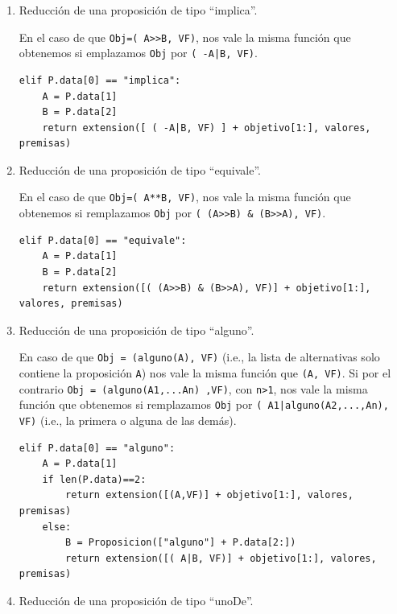 \documentclass[10pt,a4paper]{report}
\begin{document}
\begin{enumerate}
\begin{verbatim}
\end{verbatim}
\item Reducción de una proposición de tipo ``implica''.
\label{sec:orgf054ee0}

En el caso de que \texttt{Obj=( A>{}>{}B, VF)}, nos vale la misma función que obtenemos si emplazamos \texttt{Obj} por \texttt{( -A|B, VF)}.
\begin{verbatim}
elif P.data[0] == "implica":
    A = P.data[1]
    B = P.data[2]
    return extension([ ( -A|B, VF) ] + objetivo[1:], valores, premisas)
\end{verbatim}
\item Reducción de una proposición de tipo ``equivale''.
\label{sec:org54e8a53}

En el caso de que \texttt{Obj=( A**B, VF)}, nos vale la misma función que obtenemos si remplazamos \texttt{Obj} por \texttt{( (A>{}>{}B) \& (B>{}>{}A), VF)}.
\begin{verbatim}
elif P.data[0] == "equivale":
    A = P.data[1]
    B = P.data[2]
    return extension([( (A>>B) & (B>>A), VF)] + objetivo[1:], valores, premisas)
\end{verbatim}
\item Reducción de una proposición de tipo ``alguno''.
\label{sec:org2ddb761}

En caso de que \texttt{Obj = (alguno(A), VF)} (i.e., la lista de alternativas solo contiene la proposición \texttt{A}) nos vale la misma función que \texttt{(A, VF)}.
Si por el contrario \texttt{Obj = (alguno(A1,...An) ,VF)}, con \texttt{n>1}, nos vale la misma función que obtenemos si remplazamos \texttt{Obj} por \texttt{( A1|alguno(A2,...,An), VF)} (i.e., la primera o alguna de las demás).
\begin{verbatim}
elif P.data[0] == "alguno":
    A = P.data[1]
    if len(P.data)==2:
        return extension([(A,VF)] + objetivo[1:], valores, premisas)
    else:
        B = Proposicion(["alguno"] + P.data[2:])
        return extension([( A|B, VF)] + objetivo[1:], valores, premisas)
\end{verbatim}
\item Reducción de una proposición de tipo ``unoDe''.
\label{sec:orgffdc323}


\end{enumerate}
\end{document}
